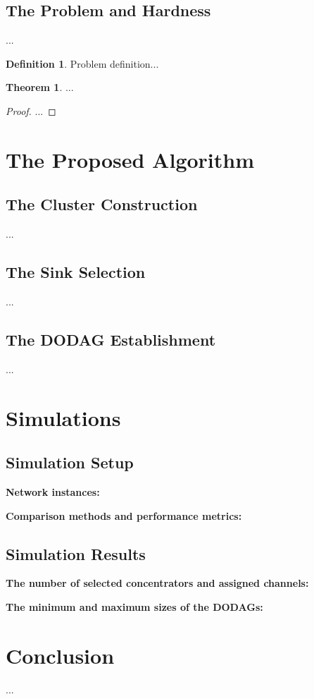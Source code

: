 \documentclass[conference]{IEEEtran}
\theoremstyle{definition}
\newtheorem{definition}{Definition}
\newtheorem{theorem}{Theorem}
\begin{document}
\subsection{The Problem and Hardness}\label{subsec:problem}
...
\begin{definition}\label{def:msplrg}
	Problem definition...
\end{definition}


\begin{theorem}\label{thm:np-hard}
	...
\end{theorem}
\begin{proof}
	...
\end{proof}

\section{The Proposed Algorithm}

\subsection{The Cluster Construction}\label{subsec: cluster construction}
...

\subsection{The Sink Selection}\label{subsec: cluster selection}
...

\subsection{The DODAG Establishment}\label{subsec: cluster prune}
...


\section{Simulations}

\subsection{Simulation Setup}

\textbf{Network instances:}

\textbf{Comparison methods and performance metrics:}

\subsection{Simulation Results}

\textbf{The number of selected concentrators and assigned channels:}

\textbf{The minimum and maximum sizes of the DODAGs:} 

\section{Conclusion}
...



%


\end{document}
